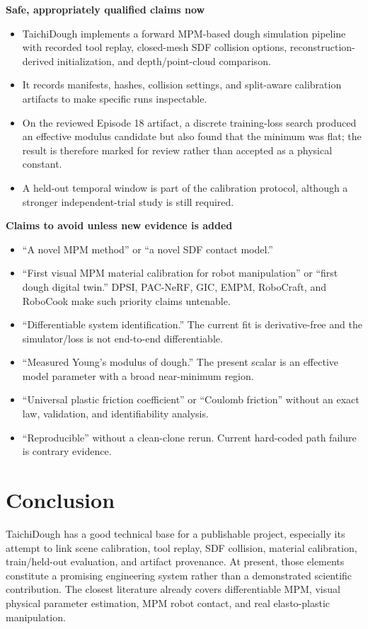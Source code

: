 \documentclass[11pt]{article}
\begin{document}
\textbf{Safe, appropriately qualified claims now}
\begin{itemize}[leftmargin=1.45em]
  \item TaichiDough implements a forward MPM-based dough simulation pipeline with recorded tool replay, closed-mesh SDF collision options, reconstruction-derived initialization, and depth/point-cloud comparison.
  \item It records manifests, hashes, collision settings, and split-aware calibration artifacts to make specific runs inspectable.
  \item On the reviewed Episode 18 artifact, a discrete training-loss search produced an effective modulus candidate but also found that the minimum was flat; the result is therefore marked for review rather than accepted as a physical constant.
  \item A held-out temporal window is part of the calibration protocol, although a stronger independent-trial study is still required.
\end{itemize}

\textbf{Claims to avoid unless new evidence is added}
\begin{itemize}[leftmargin=1.45em]
  \item ``A novel MPM method'' or ``a novel SDF contact model.''
  \item ``First visual MPM material calibration for robot manipulation'' or ``first dough digital twin.'' DPSI, PAC-NeRF, GIC, EMPM, RoboCraft, and RoboCook make such priority claims untenable.
  \item ``Differentiable system identification.'' The current fit is derivative-free and the simulator/loss is not end-to-end differentiable.
  \item ``Measured Young's modulus of dough.'' The present scalar is an effective model parameter with a broad near-minimum region.
  \item ``Universal plastic friction coefficient'' or ``Coulomb friction'' without an exact law, validation, and identifiability analysis.
  \item ``Reproducible'' without a clean-clone rerun. Current hard-coded path failure is contrary evidence.
\end{itemize}

\section*{Conclusion}

TaichiDough has a good technical base for a publishable project, especially its attempt to link scene calibration, tool replay, SDF collision, material calibration, train/held-out evaluation, and artifact provenance. At present, those elements constitute a promising engineering system rather than a demonstrated scientific contribution. The closest literature already covers differentiable MPM, visual physical parameter estimation, MPM robot contact, and real elasto-plastic manipulation.
\end{document}
